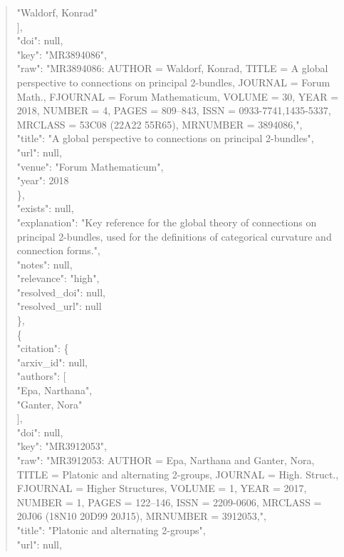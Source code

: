 \documentclass[11pt]{article}
\begin{document}
\begin{quote}
          "Waldorf, Konrad"\\
        ],\\
        "doi": null,\\
        "key": "MR3894086",\\
        "raw": "MR3894086: AUTHOR = Waldorf, Konrad, TITLE = A global perspective to connections on principal 2-bundles, JOURNAL = Forum Math., FJOURNAL = Forum Mathematicum, VOLUME = 30, YEAR = 2018, NUMBER = 4, PAGES = 809--843, ISSN = 0933-7741,1435-5337, MRCLASS = 53C08 (22A22 55R65), MRNUMBER = 3894086,",\\
        "title": "A global perspective to connections on principal 2-bundles",\\
        "url": null,\\
        "venue": "Forum Mathematicum",\\
        "year": 2018\\
      \},\\
      "exists": null,\\
      "explanation": "Key reference for the global theory of connections on principal 2-bundles, used for the definitions of categorical curvature and connection forms.",\\
      "notes": null,\\
      "relevance": "high",\\
      "resolved\_doi": null,\\
      "resolved\_url": null\\
    \},\\
    \{\\
      "citation": \{\\
        "arxiv\_id": null,\\
        "authors": [\\
          "Epa, Narthana",\\
          "Ganter, Nora"\\
        ],\\
        "doi": null,\\
        "key": "MR3912053",\\
        "raw": "MR3912053: AUTHOR = Epa, Narthana and Ganter, Nora, TITLE = Platonic and alternating 2-groups, JOURNAL = High. Struct., FJOURNAL = Higher Structures, VOLUME = 1, YEAR = 2017, NUMBER = 1, PAGES = 122--146, ISSN = 2209-0606, MRCLASS = 20J06 (18N10 20D99 20J15), MRNUMBER = 3912053,",\\
        "title": "Platonic and alternating 2-groups",\\
        "url": null,\\

\end{quote}
\end{document}
